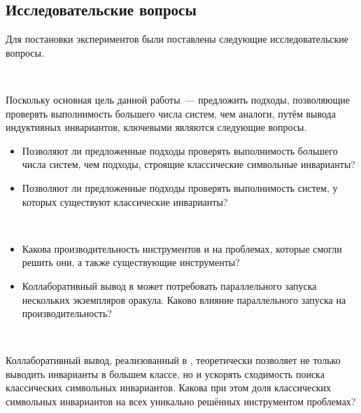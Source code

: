 \subsection{Исследовательские вопросы}

Для постановки экспериментов были поставлены следующие исследовательские вопросы.

\begin{resquest}\label{rq:conv}
$ $

Поскольку основная цель данной работы~--- предложить подходы, позволяющие проверять выполнимость б\textit{о}льшего числа систем, чем аналоги, путём вывода индуктивных инвариантов, ключевыми являются следующие вопросы.
\begin{itemize}
    \item Позволяют ли предложенные подходы проверять выполнимость б\textit{о}льшего числа систем, чем подходы, строящие классические символьные инварианты?
    \item Позволяют ли предложенные подходы проверять выполнимость систем, у которых существуют классические инварианты?
\end{itemize}
\end{resquest}

\begin{resquest}[Производительность]\label{rq:perf}
$ $

\begin{itemize}
    \item Какова производительность инструментов \theringen{} и \ringenSync{} на проблемах, которые смогли решить они, а также существующие инструменты?
    \item Коллаборативный вывод в \theringenCICI{} может потребовать параллельного запуска нескольких экземпляров оракула. Каково влияние параллельного запуска на производительность?
\end{itemize}
\end{resquest}

\begin{resquest}\label{rq:char}
$ $

Коллаборативный вывод, реализованный в \theringenCICI{}, теоретически позволяет не только выводить инварианты в большем классе, но и ускорять сходимость поиска классических символьных инвариантов. Какова при этом доля классических символьных инвариантов на всех уникально решённых инструментом \theringenCICI{} проблемах?
\end{resquest}



